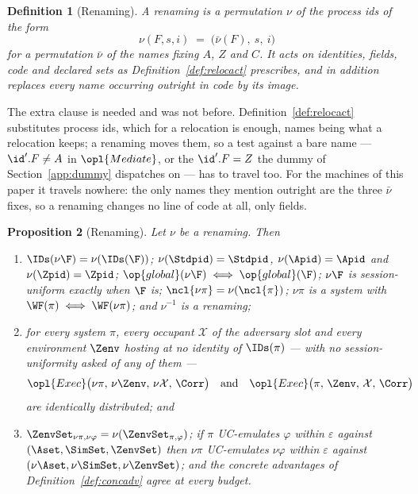 \documentclass[10pt,oneside,openany]{book}
\theoremstyle{accentdef}
\newtheorem{definition}{Definition}[chapter]
\theoremstyle{accentplain}
\newtheorem{proposition}[definition]{Proposition}
\begin{document}
\begin{definition}[Renaming]\label{def:rename}
A \emph{renaming} is a permutation $\nu$ of the process ids of the form
\[
  \nu(F,s,i) \;=\; \bigl(\bar\nu(F),\ s,\ i\bigr)
\]
for a permutation $\bar\nu$ of the names fixing $A$, $Z$ and $C$. It acts on identities, fields, code
and declared sets as Definition~\ref{def:relocact} prescribes, and in addition replaces every name
occurring outright in code by its image.
\end{definition}

The extra clause is needed and was not before. Definition~\ref{def:relocact} substitutes process ids,
which for a relocation is enough, names being what a relocation keeps; a renaming moves them, so a
test against a bare name --- $\id'.F \neq A$ in $\opl{Mediate}$, or the $\id'.F = Z$ the dummy of
Section~\ref{app:dummy} dispatches on --- has to travel too. For the machines of this paper it travels nowhere: the
only names they mention outright are the three $\bar\nu$ fixes, so a renaming changes no line of code
at all, only fields.

\begin{proposition}[Renaming]\label{prop:rename}
Let $\nu$ be a renaming. Then
\begin{enumerate}[label=(\roman*),leftmargin=2.2em]
  \item $\IDs(\nu\F) = \nu(\IDs(\F))$; $\nu(\Stdpid) = \Stdpid$, $\nu(\Apid) = \Apid$ and
        $\nu(\Zpid) = \Zpid$; $\op{global}(\nu\F) \iff \op{global}(\F)$; $\nu\F$ is session-uniform
        exactly when $\F$ is; $\ncl{\nu\pi} = \nu(\ncl{\pi})$; $\nu\pi$ is a system with
        $\WF(\pi) \iff \WF(\nu\pi)$; and $\nu^{-1}$ is a renaming;
  \item for every system $\pi$, every occupant $\mathcal{X}$ of the adversary slot and every
        environment $\Zenv$ hosting at no identity of $\IDs(\pi)$ --- with no session-uniformity
        asked of any of them ---
        \[
          \opl{Exec}\bigl(\nu\pi,\,\nu\Zenv,\,\nu\mathcal{X},\,\Corr\bigr)
          \quad\text{and}\quad
          \opl{Exec}\bigl(\pi,\,\Zenv,\,\mathcal{X},\,\Corr\bigr)
        \]
        are identically distributed; and
  \item $\ZenvSet_{\nu\pi,\nu\varphi} = \nu(\ZenvSet_{\pi,\varphi})$; if $\pi$ UC-emulates $\varphi$
        within $\varepsilon$ against $(\Aset,\SimSet,\ZenvSet)$ then $\nu\pi$ UC-emulates $\nu\varphi$
        within $\varepsilon$ against $(\nu\Aset,\nu\SimSet,\nu\ZenvSet)$; and the concrete advantages
        of Definition~\ref{def:concadv} agree at every budget.
\end{enumerate}
\end{proposition}
\end{document}
